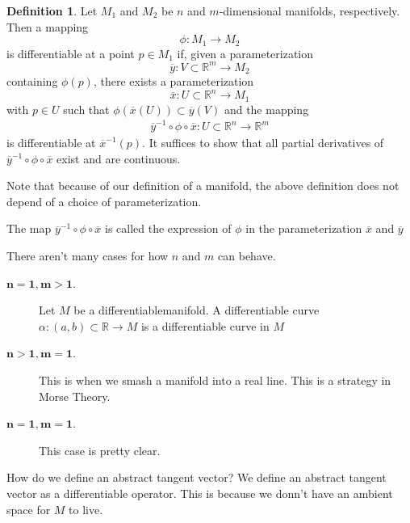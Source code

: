 \documentclass[12pt,letterpaper,boxed]{maths_v5}
\newcommand{\rr}{\mathbb{R}}
\theoremstyle{definition}
\newtheorem{definition}{Definition}[section]
\begin{document}
    \begin{definition}
        Let $M_1$ and $M_2$ be $n$ and $m$-dimensional manifolds, respectively. 
        Then a mapping 
        \[
            \phi: M_1 \to M_2
        \]
        is differentiable at a point $p \in M_1$ 
        if, given a parameterization
        \[
            \overline{y}: V \subset \rr^m \to M_2 
        \]
        containing $\phi(p)$, there exists a parameterization 
        \[
            \overline{x}: U \subset \rr^n \to M_1     
        \]
        with $p \in U$ such that $\phi(\overline{x}(U)) \subset \overline{y}(V)$
        and the mapping 
        \begin{align*}
            \overline{y}^{-1} \circ \phi \circ \overline{x}: U \subset \rr^n \to \rr^m
        \end{align*}
        is differentiable at $\overline{x}^{-1}(p)$. It suffices to show that all partial derivatives 
        of $\overline{y}^{-1}\circ \phi \circ \overline{x}$ exist and are continuous.
    \end{definition}
    Note that because of our definition of a manifold, the above definition does  
    not depend of a choice of parameterization. 

    The map $\overline{y}^{-1}\circ \phi \circ \overline{x}$ is called the expression of $\phi$ 
    in the parameterization  $\overline{x}$ and $\overline{y}$ 

    There aren't many cases for how $n$ and $m$ can behave. 
    \begin{description}
        \item[$\bm{n = 1, m > 1}$.]
        Let $M$ be a differentiablemanifold. A differentiable curve 
        $\alpha:(a,b) \subset \rr \to M$
        is  a differentiable curve in $M$  

        \item[$\bm{n >1, m = 1}$.] 
        This is when we smash a manifold into a real line. This is a strategy 
        in Morse Theory. 
        
        \item[$\bm{n = 1, m = 1}$.]  This case is pretty  clear. 
    \end{description}

    How do we define an abstract tangent vector? We define an abstract tangent 
    vector as a differentiable operator. This is because we donn't have an ambient 
    space for $M$ to live.  
\end{document}
